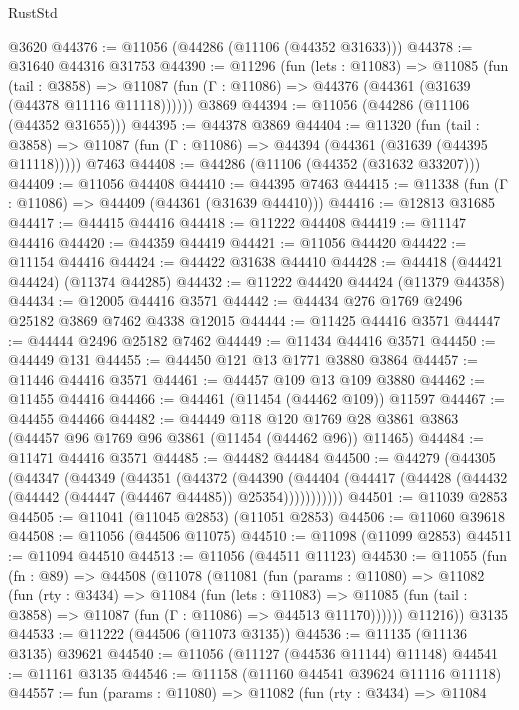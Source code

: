 \begin{lexlean}{RustStd}
\begin{coremodule}
    @3620
@44376 := @11056 (@44286 (@11106 (@44352 @31633)))
@44378 := @31640 @44316 @31753
@44390 := @11296
    (fun (lets : @11083) =>
    @11085
      (fun (tail : @3858) =>
      @11087 (fun (Γ : @11086) => @44376 (@44361 (@31639 (@44378 @11116 @11118))))))
    @3869
@44394 := @11056 (@44286 (@11106 (@44352 @31655)))
@44395 := @44378 @3869
@44404 := @11320
    (fun (tail : @3858) => @11087 (fun (Γ : @11086) => @44394 (@44361 (@31639 (@44395 @11118)))))
    @7463
@44408 := @44286 (@11106 (@44352 (@31632 @33207)))
@44409 := @11056 @44408
@44410 := @44395 @7463
@44415 := @11338 (fun (Γ : @11086) => @44409 (@44361 (@31639 @44410)))
@44416 := @12813 @31685
@44417 := @44415 @44416
@44418 := @11222 @44408
@44419 := @11147 @44416
@44420 := @44359 @44419
@44421 := @11056 @44420
@44422 := @11154 @44416
@44424 := @44422 @31638 @44410
@44428 := @44418 (@44421 @44424) (@11374 @44285)
@44432 := @11222 @44420 @44424 (@11379 @44358)
@44434 := @12005 @44416 @3571
@44442 := @44434 @276 @1769 @2496 @25182 @3869 @7462 @4338 @12015
@44444 := @11425 @44416 @3571
@44447 := @44444 @2496 @25182 @7462
@44449 := @11434 @44416 @3571
@44450 := @44449 @131
@44455 := @44450 @121 @13 @1771 @3880 @3864
@44457 := @11446 @44416 @3571
@44461 := @44457 @109 @13 @109 @3880
@44462 := @11455 @44416
@44466 := @44461 (@11454 (@44462 @109)) @11597
@44467 := @44455 @44466
@44482 := @44449
    @118
    @120
    @1769
    @28
    @3861
    @3863
    (@44457 @96 @1769 @96 @3861 (@11454 (@44462 @96)) @11465)
@44484 := @11471 @44416 @3571
@44485 := @44482 @44484
@44500 := @44279
    (@44305
      (@44347
        (@44349
          (@44351
            (@44372
              (@44390
                (@44404 (@44417 (@44428 (@44432 (@44442 (@44447 (@44467 @44485)) @25354)))))))))))
@44501 := @11039 @2853
@44505 := @11041 (@11045 @2853) (@11051 @2853)
@44506 := @11060 @39618
@44508 := @11056 (@44506 @11075)
@44510 := @11098 (@11099 @2853)
@44511 := @11094 @44510
@44513 := @11056 (@44511 @11123)
@44530 := @11055
    (fun (fn : @89) =>
    @44508
      (@11078
        (@11081
          (fun (params : @11080) =>
          @11082
            (fun (rty : @3434) =>
            @11084
              (fun (lets : @11083) =>
              @11085 (fun (tail : @3858) => @11087 (fun (Γ : @11086) => @44513 @11170))))))
        @11216))
    @3135
@44533 := @11222 (@44506 (@11073 @3135))
@44536 := @11135 (@11136 @3135) @39621
@44540 := @11056 (@11127 (@44536 @11144) @11148)
@44541 := @11161 @3135
@44546 := @11158 (@11160 @44541 @39624 @11116 @11118)
@44557 := fun (params : @11080) =>
  @11082
    (fun (rty : @3434) =>
    @11084

\end{coremodule}
\end{lexlean}
